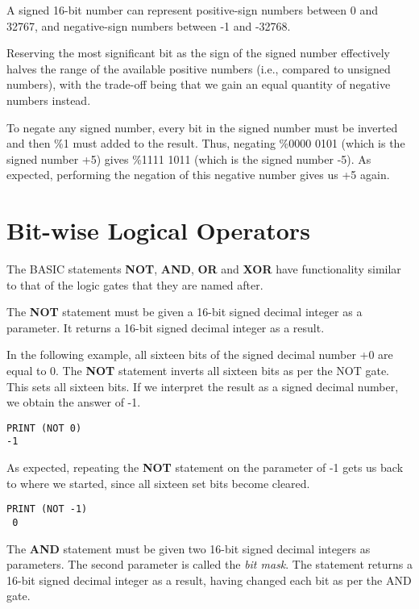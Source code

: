 A signed 16-bit number can represent positive-sign numbers between 0 and 32767, and negative-sign numbers between -1 and -32768.

Reserving the most significant bit as the sign of the signed number effectively halves the range of the available positive numbers (i.e., compared to unsigned numbers), with the trade-off being that we gain an equal quantity of negative numbers instead.

To negate any signed number, every bit in the signed number must be inverted and then \%1 must added to the result. Thus, negating \%0000 0101 (which is the signed number +5) gives \%1111 1011 (which is the signed number -5). As expected, performing the negation of this negative number gives us +5 again.

\section{Bit-wise Logical Operators}

The BASIC statements {\bf NOT}, {\bf AND}, {\bf OR} and {\bf XOR} have functionality similar to that of the logic gates that they are named after.

The {\bf NOT} statement must be given a 16-bit signed decimal integer as a parameter. It returns a 16-bit signed decimal integer as a result.

In the following example, all sixteen bits of the signed decimal number +0 are equal to 0. The {\bf NOT} statement inverts all sixteen bits as per the NOT gate. This sets all sixteen bits. If we interpret the result as a signed decimal number, we obtain the answer of -1.
\begin{tcolorbox}[colback=black,coltext=white]
\verbatimfont{\codefont}
\begin{verbatim}
PRINT (NOT 0)
-1
\end{verbatim}
\end{tcolorbox}

As expected, repeating the {\bf NOT} statement on the parameter of -1 gets us back to where we started, since all sixteen set bits become cleared.
\begin{tcolorbox}[colback=black,coltext=white]
\verbatimfont{\codefont}
\begin{verbatim}
PRINT (NOT -1)
 0
\end{verbatim}
\end{tcolorbox}

The {\bf AND} statement must be given two 16-bit signed decimal integers as parameters. The second parameter is called the {\it bit mask}. The statement returns a 16-bit signed decimal integer as a result, having changed each bit as per the AND gate.


